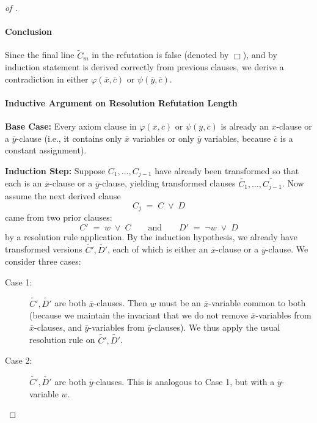 \begin{proof}[of ]
\paragraph{Conclusion}
Since the final line \(\widetilde C_m\) in the refutation is false (denoted by \(\Box\)), and by induction statement is derived correctly from previous clauses, we derive a contradiction in either \(\varphi(\overline{x}, \overline{c})\) or \(\psi(\overline{y}, \overline{c})\). 


\paragraph{Inductive Argument on Resolution Refutation Length}

\noindent
\textbf{Base Case:} 
Every axiom clause in \(\varphi(\overline{x}, \overline{c})\) or \(\psi(\overline{y}, \overline{c})\) is already an \(\overline{x}\)-clause or a \(\overline{y}\)-clause (i.e., it contains only \(\overline{x}\) variables or only \(\overline{y}\) variables, because $\overline c$ is a constant assignment).

\medskip

\noindent
\textbf{Induction Step:} 
Suppose \(C_1, \dots, C_{j-1}\) have already been transformed so that each is an \(\overline{x}\)-clause or a \(\overline{y}\)-clause, yielding transformed clauses \(\widetilde{C_1}, \dots, \widetilde{C_{j-1}}\). Now assume the next derived clause 
\[
C_j \;=\; C \;\lor\; D
\]
came from two prior clauses:
\[
C' \;=\; w \;\lor\; C
\quad\quad\text{and}\quad\quad
D' \;=\; \neg w \;\lor\; D
\]
by a resolution rule application.
By the induction hypothesis, we already have transformed versions \(\widetilde{C'}, \widetilde{D'}\), each of which is either an \(\overline{x}\)-clause or a \(\overline{y}\)-clause. We consider three cases:

\begin{description}
\item[Case 1:] 
\(\widetilde{C'}, \widetilde{D'}\) are both \(\overline{x}\)-clauses. Then \(w\) must be an \(\overline{x}\)-variable common to both (because we maintain the invariant that we do not remove $\overline x$-variables from $\overline x$-clauses, and $\overline y$-variables from $\overline y$-clauses). We thus apply the usual resolution rule on \(\widetilde{C'}, \widetilde{D'}\).

\item[Case 2:]
\(\widetilde{C'}, \widetilde{D'}\) are both \(\overline{y}\)-clauses. This is analogous to Case 1, but with a \(\overline{y}\)-variable \(w\).


\end{description}
\end{proof}
